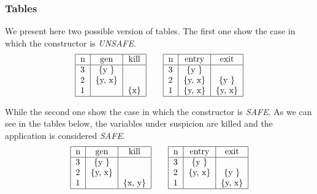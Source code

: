 \documentclass[letterpaper,twocolumn,10pt]{article}
\begin{document}
\subsubsection{Tables}
We present here two possible version of tables. The first one show the case in which the constructor is \emph{UNSAFE}.
\begin{align*}
\begin{tabular}{|l|*{2}{c|}}
  \hline
  n & gen & kill  \\
  \hline 
  3 & \{y \} & \\ 
  2 & \{y, x\} & \\
  1 &  & \{x\} \\
  \hline
\end{tabular}
\qquad
\begin{tabular}{|l|*{2}{c|}}
  \hline
  n & entry & exit \\
  \hline 
  3 & \{y \} & \\ 
  2 & \{y, x\} & \{y \}\\
  1 & \{y, x\} & \{y, x\} \\
  \hline
\end{tabular}
\end{align*}

While the second one show the case in which the constructor is \emph{SAFE}. As we can see in the tables below, the variables under suspicion are killed and the application is considered \emph{SAFE}.
\begin{align*}
\begin{tabular}{|l|*{2}{c|}}
  \hline
  n & gen & kill  \\
  \hline 
  3 & \{y \} & \\ 
  2 & \{y, x\} & \\
  1 &  & \{x, y\} \\
  \hline
\end{tabular}
\qquad
\begin{tabular}{|l|*{2}{c|}}
  \hline
  n & entry & exit \\
  \hline 
  3 & \{y \} & \\ 
  2 & \{y, x\} & \{y \}\\
  1 &  & \{y, x\} \\
  \hline
\end{tabular}
\end{align*}

\end{document}
